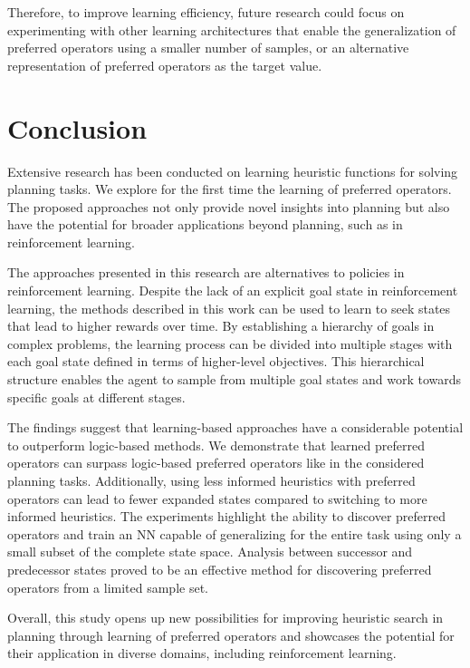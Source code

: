 \documentclass[ppgc,diss,english]{iiufrgs}
\begin{document}
Therefore, to improve learning efficiency, future research could focus on experimenting with other learning architectures that enable the generalization of preferred operators using a smaller number of samples, or an alternative representation of preferred operators as the target value.

\chapter{Conclusion}
\label{cha:conclusion}
Extensive research has been conducted on learning heuristic functions for solving planning tasks. We explore for the first time the learning of preferred operators. The proposed approaches not only provide novel insights into planning but also have the potential for broader applications beyond planning, such as in reinforcement learning.

The approaches presented in this research are alternatives to policies in reinforcement learning. Despite the lack of an explicit goal state in reinforcement learning, the methods described in this work can be used to learn to seek states that lead to higher rewards over time. By establishing a hierarchy of goals in complex problems, the learning process can be divided into multiple stages with each goal state defined in terms of higher-level objectives. This hierarchical structure enables the agent to sample from multiple goal states and work towards specific goals at different stages.

The findings suggest that learning-based approaches have a considerable potential to outperform logic-based methods. We demonstrate that learned preferred operators can surpass logic-based preferred operators like \poff in the considered planning tasks. Additionally, using less informed heuristics with preferred operators can lead to fewer expanded states compared to switching to more informed heuristics. The experiments highlight the ability to discover preferred operators and train an NN capable of generalizing for the entire task using only a small subset of the complete state space. Analysis between successor and predecessor states proved to be an effective method for discovering preferred operators from a limited sample set.

Overall, this study opens up new possibilities for improving heuristic search in planning through learning of preferred operators and showcases the potential for their application in diverse domains, including reinforcement learning.
\end{document}
